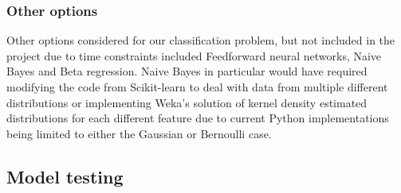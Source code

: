 
\subsubsection*{Other options}

Other options considered for our classification problem, but not included in the project due to time constraints included Feedforward neural networks, Naive Bayes and Beta regression.
Naive Bayes in particular would have required modifying the code from Scikit-learn to deal with data from multiple different distributions or implementing Weka's solution of kernel density estimated distributions for each different feature\autocite{john_estimating_1995} due to current Python implementations being limited to either the Gaussian or Bernoulli case.

%
%
%
%
%

\subsection{Model testing}
\label{classifierverification}

